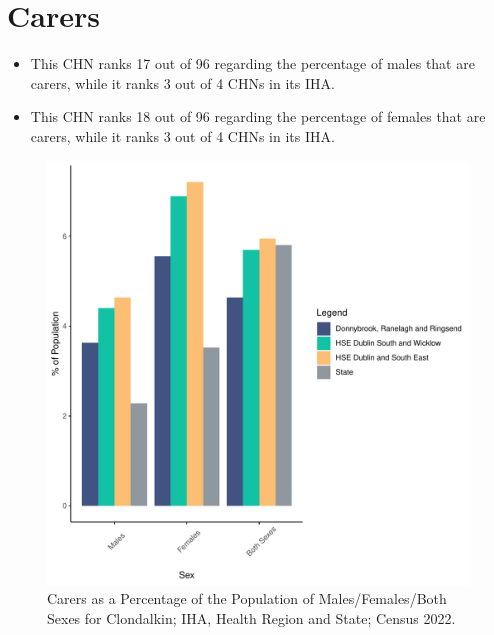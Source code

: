 \documentclass{article}
\begin{document}
\section{Carers}\label{sect:Carers}
\begin{itemize}
\item This CHN ranks  17 out of 96 regarding the percentage of males that are carers, while it ranks   3 out of 4 CHNs in its IHA.
\item This CHN ranks  18 out of 96 regarding the percentage of females that are carers, while it ranks   3 out of 4 CHNs in its IHA.
\end{itemize}
\begin{figure}[H]
	\centering
	\includegraphics[width = 150mm]{../figures/CareED.pdf}
	\caption{Carers as a Percentage of the Population of Males/Females/Both Sexes for Clondalkin; IHA, Health Region and State; Census 2022.}
	\label{fig:2ae19629-1a6a-13a3-e055-000000000001}
	\end{figure}
\end{document}
